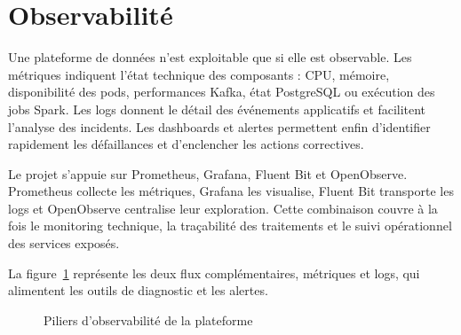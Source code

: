 \section{Observabilité}

Une plateforme de données n'est exploitable que si elle est observable. Les métriques indiquent l'état technique des composants : CPU, mémoire, disponibilité des pods, performances Kafka, état PostgreSQL ou exécution des jobs Spark. Les logs donnent le détail des événements applicatifs et facilitent l'analyse des incidents. Les dashboards et alertes permettent enfin d'identifier rapidement les défaillances et d'enclencher les actions correctives.

Le projet s'appuie sur Prometheus, Grafana, Fluent Bit et OpenObserve. Prometheus collecte les métriques, Grafana les visualise, Fluent Bit transporte les logs et OpenObserve centralise leur exploration. Cette combinaison couvre à la fois le monitoring technique, la traçabilité des traitements et le suivi opérationnel des services exposés.

La figure~\ref{fig:observabilite} représente les deux flux complémentaires, métriques et logs, qui alimentent les outils de diagnostic et les alertes.

\begin{figure}[H]
\centering
\vspace{0.4em}
\vspace{0.6em}
\caption{Piliers d'observabilité de la plateforme}
\label{fig:observabilite}
\end{figure}
\vspace{0.8em}

